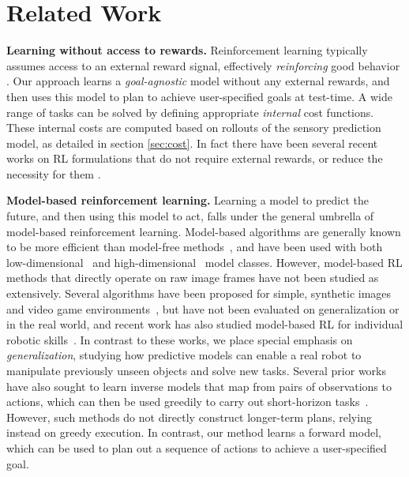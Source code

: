 \section{Related Work}\label{sec:rel_work}

\textbf{Learning without access to rewards.}
Reinforcement learning typically assumes access to an external reward signal, effectively \emph{reinforcing} good behavior \cite{lillicrap2015continuous, sutton1998reinforcement}. Our approach learns a \emph{goal-agnostic} model without any external rewards, and then uses this model to plan to achieve user-specified goals at test-time.
A wide range of tasks can be solved by defining appropriate \emph{internal} cost functions. These internal costs are computed based on rollouts of the sensory prediction model, as detailed in section \ref{sec:cost}. In fact there have been several recent works on RL formulations that do not require external rewards\cite{chentanez2005intrinsically, pathak2017curiosity}, or reduce the necessity for them \cite{andrychowicz2017hindsight}.

\noindent \textbf{Model-based reinforcement learning.} Learning a model to predict the future, and then using this model to act, falls under the general umbrella of model-based reinforcement learning. Model-based algorithms are generally known to be more efficient than model-free methods~\cite{chua2018deep, deisenroth2013survey}, and have been used with both low-dimensional~\cite{deisenroth2011pilco} and high-dimensional~\cite{nagabandi2017neural} model classes. However, model-based RL methods that directly operate on raw image frames have not been studied as extensively. Several algorithms have been proposed for simple, synthetic images~\cite{watter2015embed} and video game environments~\cite{alexey, ha2018world, atarioh}, but have not been evaluated on generalization or in the real world, and recent work has also studied model-based RL for individual robotic skills~\cite{zhang2018solar}. In contrast to these works, we place special emphasis on \emph{generalization}, studying how predictive models can enable a real robot to manipulate previously unseen objects and solve new tasks.
Several prior works have also sought to learn inverse models that map from pairs of observations to actions, which can then be used greedily to carry out short-horizon tasks~\cite{agrawal2016learning,nair2017combining, ropes}. However, such methods do not directly construct longer-term plans, relying instead on greedy execution. In contrast, our method learns a forward model, which can be used to plan out a sequence of actions to achieve a user-specified goal.


